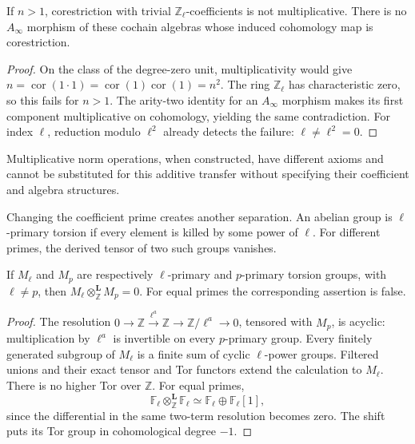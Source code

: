 \begin{proposition}\label{v4-arith:coefficients:prop:transfer}
If \(n>1\), corestriction with trivial \(\mathbb Z_\ell\)-coefficients
is not multiplicative. There is no \(A_\infty\) morphism of these
cochain algebras whose induced cohomology map is corestriction.
\end{proposition}
\begin{proof}
On the class of the degree-zero unit, multiplicativity would give
\(n=\operatorname{cor}(1\cdot1)
=\operatorname{cor}(1)\operatorname{cor}(1)=n^2\).
The ring \(\mathbb Z_\ell\) has characteristic zero, so this fails
for \(n>1\). The arity-two identity for an \(A_\infty\) morphism
makes its first component multiplicative on cohomology, yielding
the same contradiction. For index \(\ell\), reduction modulo
\(\ell^2\) already detects the failure: \(\ell\ne\ell^2=0\).
\end{proof}

Multiplicative norm operations, when constructed, have different
axioms and cannot be substituted for this additive transfer without
specifying their coefficient and algebra structures.

Changing the coefficient prime creates another separation. An abelian
group is \(\ell\)-primary torsion if every element is killed by some
power of \(\ell\). For different primes, the derived tensor of two
such groups vanishes.

\begin{proposition}\label{v4-arith:coefficients:prop:primary}
If \(M_\ell\) and \(M_p\) are respectively \(\ell\)-primary and
\(p\)-primary torsion groups, with \(\ell\ne p\), then
\(M_\ell\otimes^{\mathbf L}_{\mathbb Z}M_p=0\).
For equal primes the corresponding assertion is false.
\end{proposition}
\begin{proof}
The resolution
\(0\to\mathbb Z\xrightarrow{\ell^a}\mathbb Z
\to\mathbb Z/\ell^a\to0\), tensored with \(M_p\), is acyclic:
multiplication by \(\ell^a\) is invertible on every \(p\)-primary
group. Every finitely generated subgroup of \(M_\ell\) is a finite
sum of cyclic \(\ell\)-power groups. Filtered unions and their exact
tensor and Tor functors extend the calculation to \(M_\ell\).
There is no higher Tor over \(\mathbb Z\). For equal primes,
\[
 \mathbb F_\ell\otimes^{\mathbf L}_{\mathbb Z}\mathbb F_\ell
 \simeq\mathbb F_\ell\oplus\mathbb F_\ell[1],
\]
since the differential in the same two-term resolution becomes zero.
The shift puts its Tor group in cohomological degree \(-1\).
\end{proof}


